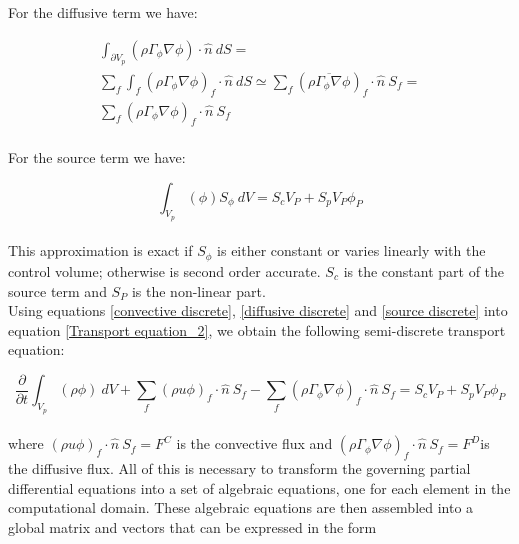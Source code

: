 \documentclass[a5paper]{sapthesis}
\begin{document}
	For the diffusive term we have:
	
	\begin{equation}
		\begin{aligned}
			\int_{\partial{V_{p}}}{(\rho \Gamma_{\phi} \nabla \phi)} \cdot \hat{n}\ dS = \\ 
			\sum_{f}\int_{f}{(\rho \Gamma_{\phi} \nabla \phi)_{f}} \cdot \hat{n}\ dS \simeq \sum_{f} (\overline{\rho \Gamma_{\phi} \nabla \phi})_{f} \cdot \hat{n} \ S_{f} =\\
			\sum_{f} (\rho \Gamma_{\phi} \nabla \phi)_{f} \cdot \hat{n} \ S_{f}
		\label{diffusive discrete}
	\end{aligned} 
	\end{equation}
	\\
	For the source term we have:
	
	\begin{equation}
		\int_{V_{p}}{(\phi) S_{\phi}} \ dV = S_{c}V_{P} + S_{p}V_{P}\phi_{P}
		\label{source discrete}
	\end{equation}	
	\\
	This approximation is exact if $S_{\phi}$ is either constant or varies linearly with the control volume; otherwise is second order accurate. $S_{c}$ is the constant part of the source term and $S_{P}$ is the non-linear part.
	\\
	Using equations \ref{convective discrete}, \ref{diffusive discrete} and \ref{source discrete} into equation \ref{Transport equation_2}, we obtain the following  semi-discrete transport equation:
	
	\begin{equation}
		\dfrac{\partial}{\partial{t}}\int_{V_{p}}{{(\rho \phi)}}\ dV + \sum_{f} (\rho u \phi)_{f} \cdot \hat{n} \ S_{f} - \sum_{f} (\rho \Gamma_{\phi} \nabla \phi)_{f} \cdot \hat{n} \ S_{f} = S_{c}V_{P} + S_{p}V_{P}\phi_{P}
		\label{Discrete transport equation_2}
	\end{equation}
	\\
	where $(\rho u \phi)_{f} \cdot \hat{n} \ S_{f} = F^{C}$ is the convective flux and $(\rho \Gamma_{\phi} \nabla \phi)_{f} \cdot \hat{n} \ S_{f}=F^{D}$is the diffusive flux.
	All of this is necessary to transform the governing partial differential equations into a set of algebraic equations, one for each element in the computational domain. These algebraic equations are then assembled into a global matrix and vectors that can be expressed in the form 
	
\end{document}
